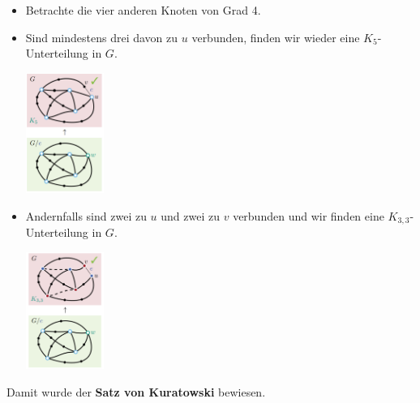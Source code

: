 \begin{itemize}
\begin{itemize}
\begin{center}
	\end{center}
	\item Betrachte die vier anderen Knoten von Grad 4.
	\item Sind mindestens drei davon zu $u$ verbunden, finden wir wieder eine $K_5$-Unterteilung in $G$.
	\begin{center}
		\includegraphics[width=0.2\textwidth]{images/kuratowski-3.png}
	\end{center}
	\item Andernfalls sind zwei zu $u$ und zwei zu $v$ verbunden und wir finden eine $K_{3,3}$-Unterteilung in $G$.
	\begin{center}
		\includegraphics[width=0.2\textwidth]{images/kuratowski-4.png}
	\end{center}
	\end{itemize}
\end{itemize}

Damit wurde der \textbf{Satz von Kuratowski} bewiesen.